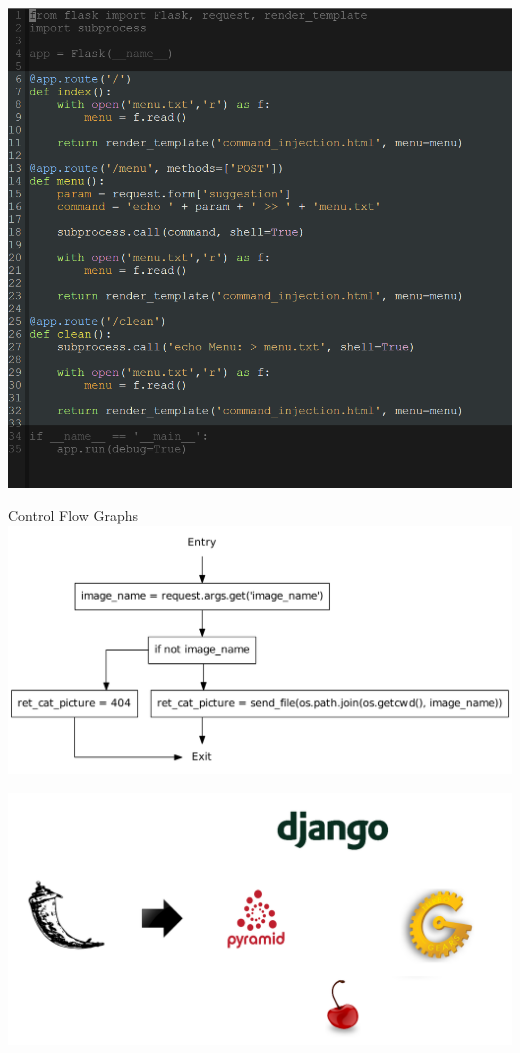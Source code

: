 \begin{frame}
  \includegraphics[height=0.8\textheight]{graphics/adaptor_flask}
\end{frame}


\begin{frame}{Control Flow Graphs}
  \center
  \includegraphics[height=0.75\textheight]{graphics/cfg_path_traversal}
\end{frame}



\begin{frame}
  \center
  \includegraphics[width=\textwidth]{graphics/adaptor}
\end{frame}
